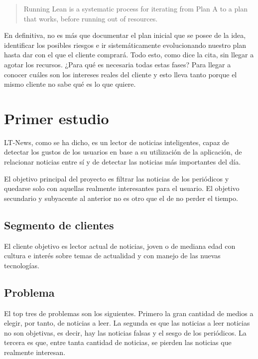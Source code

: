 \begin{quote}
	\small Running Lean is a systematic process for iterating from Plan A to a plan that works, before running out of resources.
	\begin{flushright}
	\end{flushright}
\end{quote}

En definitiva, no es más que documentar el plan inicial que se posee de la idea, identificar los posibles riesgos e ir sistemáticamente evolucionando nuestro plan hasta dar con el que el cliente comprará. Todo esto, como dice la cita, sin llegar a agotar los recursos. ¿Para qué es necesaria todas estas fases? Para llegar a conocer cuáles son los intereses reales del cliente y esto lleva tanto porque el mismo cliente no sabe qué es lo que quiere.



\section{Primer estudio}\label{sec:primer_estudio}

LT-News, como se ha dicho, es un lector de noticias inteligentes, capaz de detectar los gustos de los usuarios en base a su utilización de la aplicación, de relacionar noticias entre sí y de detectar las noticias más importantes del día.

El objetivo principal del proyecto es filtrar las noticias de los periódicos y quedarse solo con aquellas realmente interesantes para el usuario. El objetivo secundario y subyacente al anterior no es otro que el de no perder el tiempo.


\subsection{Segmento de clientes}
El cliente objetivo es lector actual de noticias, joven o de mediana edad con cultura e interés sobre temas de actualidad y con manejo de las nuevas tecnologías. 

\subsection{Problema}
El top tres de problemas son los siguientes. Primero la gran cantidad de medios a elegir, por tanto, de noticias a leer. La segunda es que las noticias a leer noticias no son objetivas, es decir, hay las noticias falsas y el sesgo de los periódicos. La tercera es que, entre tanta cantidad de noticias, se pierden las noticias que realmente interesan.

